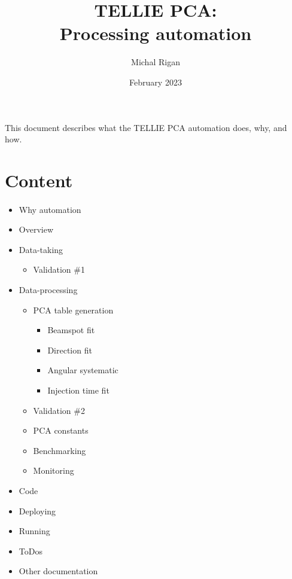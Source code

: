 \documentclass[12pt]{article}
\title{\textbf{TELLIE PCA: \\ Processing automation}}
\date{February 2023}
\author{Michal Rigan}
\begin{document}
\maketitle{}

\vspace{7cm}
\paragraph{}
This document describes what the TELLIE PCA automation does, why, and how.
\clearpage

\section{Content}
\paragraph{}
\begin{itemize}
	\item Why automation
	\item Overview
	\item Data-taking
	\begin{itemize}
		\item Validation \#1
	\end{itemize}
	\item Data-processing
	\begin{itemize}
		\item PCA table generation
		\begin{itemize}
			\item Beamspot fit
			\item Direction fit
			\item Angular systematic
			\item Injection time fit
		\end{itemize}
		\item Validation \#2
		\item PCA constants
		\item Benchmarking
		\item Monitoring
	\end{itemize}
	\item Code %
	\item Deploying %
	\item Running
	\item ToDos
	\item Other documentation %
\end{itemize}
\end{document}
